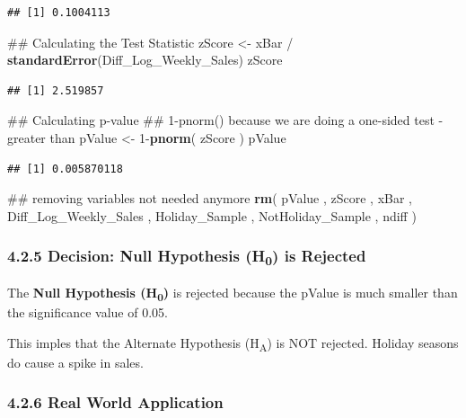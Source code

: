 \documentclass[]{article}
\newenvironment{Shaded}{\begin{snugshade}}{\end{snugshade}}
\newcommand{\KeywordTok}[1]{\textcolor[rgb]{0.13,0.29,0.53}{\textbf{{#1}}}}
\newcommand{\DecValTok}[1]{\textcolor[rgb]{0.00,0.00,0.81}{{#1}}}
\newcommand{\StringTok}[1]{\textcolor[rgb]{0.31,0.60,0.02}{{#1}}}
\newcommand{\NormalTok}[1]{{#1}}
\begin{document}
\begin{verbatim}
## [1] 0.1004113
\end{verbatim}

\begin{Shaded}
\begin{Highlighting}[]
\NormalTok{## Calculating the Test Statistic}
\NormalTok{zScore <-}\StringTok{ }\NormalTok{xBar /}\StringTok{ }\KeywordTok{standardError}\NormalTok{(Diff_Log_Weekly_Sales)}
\NormalTok{zScore}
\end{Highlighting}
\end{Shaded}

\begin{verbatim}
## [1] 2.519857
\end{verbatim}

\begin{Shaded}
\begin{Highlighting}[]
\NormalTok{## Calculating p-value}
\NormalTok{## 1-pnorm() because we are doing a one-sided test - greater than}
\NormalTok{pValue <-}\StringTok{ }\DecValTok{1}\NormalTok{-}\KeywordTok{pnorm}\NormalTok{( zScore ) }
\NormalTok{pValue}
\end{Highlighting}
\end{Shaded}

\begin{verbatim}
## [1] 0.005870118
\end{verbatim}

\begin{Shaded}
\begin{Highlighting}[]
\NormalTok{## removing variables not needed anymore}
\KeywordTok{rm}\NormalTok{( pValue , zScore , xBar , Diff_Log_Weekly_Sales , Holiday_Sample , NotHoliday_Sample , ndiff )}
\end{Highlighting}
\end{Shaded}

\subsubsection{4.2.5 Decision: Null Hypothesis (H\textsubscript{0}) is
Rejected}\label{decision-null-hypothesis-h0-is-rejected}

The \textbf{Null Hypothesis (H\textsubscript{0})} is rejected because
the pValue is much smaller than the significance value of 0.05.

This imples that the Alternate Hypothesis (H\textsubscript{A}) is NOT
rejected. Holiday seasons do cause a spike in sales.

\subsubsection{4.2.6 Real World
Application}\label{real-world-application-1}
\end{document}
